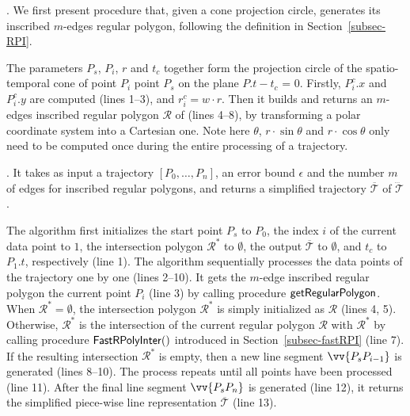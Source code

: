 
.
We first present procedure  that, given a cone projection circle, generates its inscribed $m$-edges regular polygon,  following the definition in Section~\ref{subsec-RPI}.

The parameters $P_s$, $P_i$, $r$ and $t_c$ together form the projection circle  of the spatio-temporal cone  of point $P_{i}$ \wrt point $P_s$ on the plane $P.t - t_c$ = $0$. Firstly, $P^c_i.x$ and $P^c_i.y$ are computed (lines 1--3), and $r^c_i = w\cdot r$.
Then it builds and returns an $m$-edges inscribed regular polygon $\mathcal{R}$ of  (lines 4--8), by transforming a polar coordinate system
into a Cartesian one. Note here $\theta$, $r\cdot\sin\theta$ and $r\cdot\cos\theta$ only need to be computed once during the entire processing of a trajectory.


.
It takes as input a trajectory ${[P_0, \ldots, P_n]}$, an error bound $\epsilon$ and the number $m$ of edges for inscribed regular polygons, and returns a simplified  trajectory $\overline{\mathcal{T}}$ of $\dddot{\mathcal{T}}$.



The algorithm first initializes the start point $P_s$ to $P_0$, the index $i$ of the current data point to $1$, the intersection polygon $\mathcal{R}^*$ to $\emptyset$, the output $\overline{\mathcal{T}}$ to $\emptyset$, and $t_c$ to $P_1.t$, respectively (line 1).
%
The algorithm sequentially processes the data points of the trajectory one by one  (lines 2--10). It gets the $m$-edge inscribed regular polygon \wrt the current point $P_i$ (line 3) by calling procedure ${\mathsf{getRegularPolygon}}$. When $\mathcal{R}^* = \emptyset$, the intersection polygon $\mathcal{R}^*$ is simply initialized as $\mathcal{R}$ (lines 4, 5). Otherwise,
$\mathcal{R}^*$ is  the intersection of the current regular polygon $\mathcal{R}$ with $\mathcal{R}^*$ by calling procedure ${\mathsf{FastRPolyInter}}()$ introduced in Section~\ref{subsec-fastRPI} (line 7). If the resulting intersection $\mathcal{R}^*$ is empty, then a new line segment $\vv{P_sP_{i-1}}$ is generated (lines 8--10). The process repeats until all points have been processed (line 11).
After the  final line segment $\vv{P_sP_{n}}$ is generated (line 12), it returns the simplified  piece-wise line representation $\overline{\mathcal{T}}$ (line 13).





